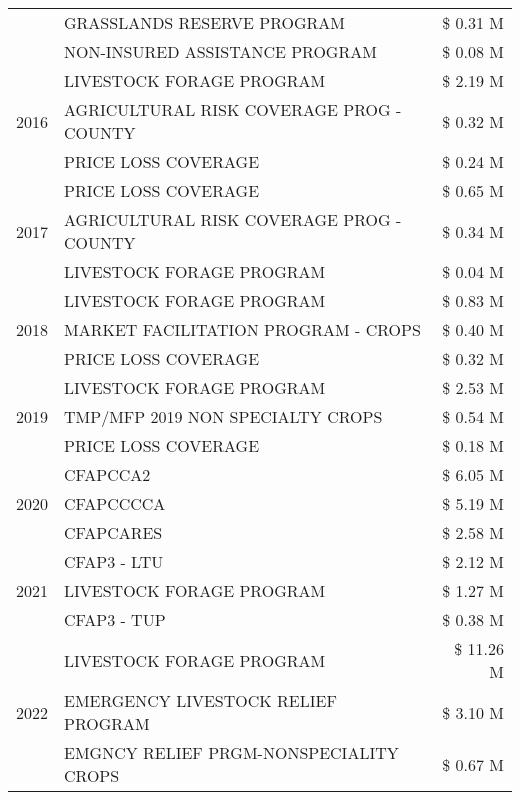 \begin{tabular}{llr}
 & GRASSLANDS RESERVE PROGRAM & \$ 0.31 M \\
 & NON-INSURED ASSISTANCE PROGRAM & \$ 0.08 M \\
\cline{1-3}
\multirow[t]{3}{*}{2016} & LIVESTOCK FORAGE PROGRAM & \$ 2.19 M \\
 & AGRICULTURAL RISK COVERAGE PROG - COUNTY & \$ 0.32 M \\
 & PRICE LOSS COVERAGE & \$ 0.24 M \\
\cline{1-3}
\multirow[t]{3}{*}{2017} & PRICE LOSS COVERAGE & \$ 0.65 M \\
 & AGRICULTURAL RISK COVERAGE PROG - COUNTY & \$ 0.34 M \\
 & LIVESTOCK FORAGE PROGRAM & \$ 0.04 M \\
\cline{1-3}
\multirow[t]{3}{*}{2018} & LIVESTOCK FORAGE PROGRAM & \$ 0.83 M \\
 & MARKET FACILITATION PROGRAM - CROPS & \$ 0.40 M \\
 & PRICE LOSS COVERAGE & \$ 0.32 M \\
\cline{1-3}
\multirow[t]{3}{*}{2019} & LIVESTOCK FORAGE PROGRAM & \$ 2.53 M \\
 & TMP/MFP 2019 NON SPECIALTY CROPS & \$ 0.54 M \\
 & PRICE LOSS COVERAGE & \$ 0.18 M \\
\cline{1-3}
\multirow[t]{3}{*}{2020} & CFAPCCA2 & \$ 6.05 M \\
 & CFAPCCCCA & \$ 5.19 M \\
 & CFAPCARES & \$ 2.58 M \\
\cline{1-3}
\multirow[t]{3}{*}{2021} & CFAP3 - LTU & \$ 2.12 M \\
 & LIVESTOCK FORAGE PROGRAM & \$ 1.27 M \\
 & CFAP3 - TUP & \$ 0.38 M \\
\cline{1-3}
\multirow[t]{3}{*}{2022} & LIVESTOCK FORAGE PROGRAM & \$ 11.26 M \\
 & EMERGENCY LIVESTOCK RELIEF PROGRAM & \$ 3.10 M \\
 & EMGNCY RELIEF PRGM-NONSPECIALITY CROPS & \$ 0.67 M \\
\cline{1-3}
\bottomrule
\end{tabular}
